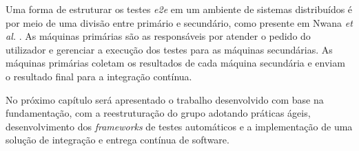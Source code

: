Uma forma de estruturar os testes \emph{e2e} em um ambiente de sistemas distribuídos é por meio de uma divisão entre primário e secundário, como presente em Nwana \emph{et al.} \cite{nwana}. As máquinas primárias são as responsáveis por atender o pedido do utilizador e gerenciar a execução dos testes para as máquinas secundárias. As máquinas primárias coletam os resultados de cada máquina secundária e enviam o resultado final para a integração contínua.

No próximo capítulo será apresentado o trabalho desenvolvido com base na fundamentação, com a reestruturação do grupo adotando práticas ágeis, desenvolvimento dos \emph{frameworks} de testes automáticos e a implementação de uma solução de integração e entrega contínua de software.
